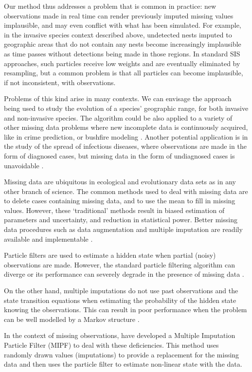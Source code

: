 \documentclass[11pt,a4paper]{article}
\begin{document}
Our method thus addresses a problem that is common in practice: new observations made in real time can render previously imputed missing values implausible, and may even conflict with what has been simulated. For example, in the invasive species context described above, undetected nests imputed to geographic areas that do not contain any nests become increasingly implausible as time passes without detections being made in those regions. In standard SIS approaches, such particles receive low weights and are eventually eliminated by resampling, but a common problem is that all particles can become implausible, if not inconsistent, with observations.

Problems of this kind arise in many contexts. {\color{red} We can envisage the approach being used to study the evolution of a species' geographic range, for both invasive and non-invasive species. The algorithm could be also applied to a variety of other missing data problems where new incomplete data is continuously acquired, like in crime prediction, \cite{Malathy} or bushfire modeling \cite{Beer}.} Another potential application is in the study of the spread of infectious diseases, where observations are made in the form of diagnosed cases, but missing data in the form of undiagnosed cases is unavoidable \cite{O'Neill}. 


Missing data are ubiquitous in ecological and evolutionary data sets as in any other branch of science. The common methods used to deal with missing data are to delete cases containing missing data, and to use the mean to fill in missing values. However, these ‘traditional’ methods result in biased estimation of parameters and uncertainty, and reduction in statistical power. Better missing data procedures such as data augmentation \cite{Tanner} and multiple imputation \cite{RubinMI} are readily available and implementable \cite{Nakagawa}.

Particle filters are used to estimate a hidden state when partial (noisy) observations are made. However, the standard particle filtering algorithm can diverge or its performance can severely degrade in the presence of missing data \cite{Zhang}.

On the other hand, multiple imputations do not use past observations and the state transition equations when estimating the probability of the hidden state knowing the observations. This can result in poor performance when the problem can be well modelled by a Markov structure \cite{Zhang}.

In the context of missing observations, \cite{Zhang} have developed a Multiple Imputation Particle Filter (MIPF) to deal with these deficiencies. This method uses randomly drawn values (imputations) to provide a replacement for the missing data and then uses the particle filter to estimate non-linear state with the data.
\end{document}

